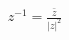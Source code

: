\documentclass[preview]{standalone}
\begin{document}
\begin{align*}
z^{-1} = \frac{\bar{z}}{|z|^2}
\end{align*}
\end{document}
